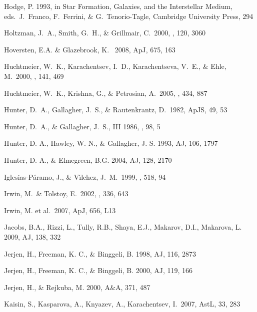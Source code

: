 \documentclass[12pt,preprint]{aastex}
\begin{document}
\begin{thebibliography}{}
Hodge, P. 1993, in Star Formation, Galaxies, and the Interstellar Medium,
   eds.\ J.\ Franco, F.\ Ferrini, \& G.\ Tenorio-Tagle, Cambridge University 
   Press, 294

Holtzman, J.~A., Smith, G.~H., \& Grillmair, C.\ 2000, \aj, 120, 3060 

Hoversten, E.A. \& Glazebrook, K. \ 2008, ApJ, 675, 163 

Huchtmeier, W.~K., Karachentsev, I.~D., Karachentseva, V.~E., \& 
   Ehle, M.\ 2000, \aaps, 141, 469 

Huchtmeier, W.~K., Krishna, G., \& Petrosian, A.\ 2005, \aap, 434, 887 

Hunter, D.~A., Gallagher, J.~S., \& Rautenkrantz, D.\ 1982, ApJS, 49, 53

Hunter, D.~A., \& Gallagher, J.~S., III 1986, \pasp, 98, 5 

Hunter, D. A., Hawley, W. N., \& Gallagher, J. S. 1993, AJ, 106, 1797

Hunter, D. A., \& Elmegreen, B.G. 2004, AJ, 128, 2170

Iglesias-P{\'a}ramo, J., \& V{\'{\i}}lchez, J.~M.\ 1999, \apj, 518, 94 

Irwin, M.~\& Tolstoy, E.\ 2002, \mnras, 336, 643 

Irwin, M. et al.\ 2007, ApJ, 656, L13 

Jacobs, B.A., Rizzi, L., Tully, R.B., Shaya, E.J., Makarov, D.I., Makarova, L. 2009, AJ, 138, 332
 
Jerjen, H., Freeman, K. C., \& Binggeli, B. 1998, AJ, 116, 2873

Jerjen, H., Freeman, K. C., \& Binggeli, B. 2000, AJ, 119, 166 
 
Jerjen, H., \& Rejkuba, M. 2000, A\&A, 371, 487 

Kaisin, S., Kasparova, A., Knyazev, A., Karachentsev, I.\ 2007, AstL, 33, 283 


\end{thebibliography}
\end{document}
